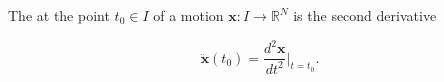The  at the point $t_0 \in I$ of a motion $\mathbf{x}: I \rightarrow \mathbb{R}^N$ is the second derivative

$$\ddot{\mathbf{x}}(t_0) = \frac{d^2\mathbf{x}}{dt^2} \bigg|_{t=t_0}.$$
